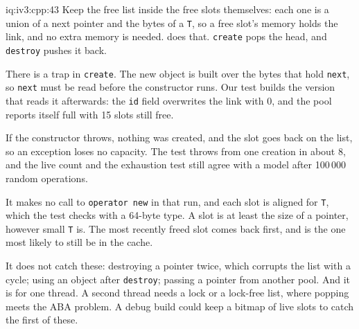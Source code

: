 \begin{solution}{iq:iv3:cpp:43}
Keep the free list inside the free slots themselves: each one is a union of a next pointer and the bytes of a \texttt{T}, so a free slot's memory holds the link, and no extra memory is needed.  does that. \texttt{create} pops the head, and \texttt{destroy} pushes it back.
\label{lst:iv3:cp:pool}

There is a trap in \texttt{create}. The new object is built over the bytes that hold \texttt{next}, so \texttt{next} must be read before the constructor runs. Our test builds the version that reads it afterwards: the \texttt{id} field overwrites the link with 0, and the pool reports itself full with 15 slots still free.

If the constructor throws, nothing was created, and the slot goes back on the list, so an exception loses no capacity. The test throws from one creation in about 8, and the live count and the exhaustion test still agree with a model after 100\,000 random operations.

It makes no call to \texttt{operator new} in that run, and each slot is aligned for \texttt{T}, which the test checks with a 64-byte type. A slot is at least the size of a pointer, however small \texttt{T} is. The most recently freed slot comes back first, and is the one most likely to still be in the cache.

It does not catch these: destroying a pointer twice, which corrupts the list with a cycle; using an object after \texttt{destroy}; passing a pointer from another pool. And it is for one thread. A second thread needs a lock or a lock-free list, where popping meets the ABA problem. A debug build could keep a bitmap of live slots to catch the first of these.

\end{solution}

